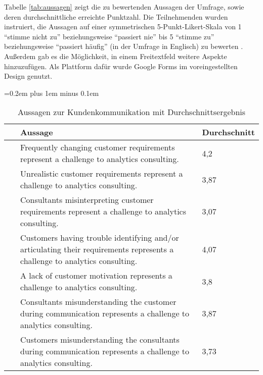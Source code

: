 \documentclass[../main.tex]{subfiles}
\begin{document}
Tabelle \ref{tab:aussagen} zeigt die zu bewertenden Aussagen der Umfrage, sowie deren durchschnittliche erreichte Punktzahl.
Die Teilnehmenden wurden instruiert, die Aussagen auf einer symmetrischen 5-Punkt-Likert-Skala von 1 “stimme nicht zu” beziehungsweise “passiert nie” bis 5 “stimme zu” beziehungsweise “passiert häufig” (in der Umfrage in Englisch) zu bewerten \autocite{joshi2015likert}. 
Außerdem gab es die Möglichkeit, in einem Freitextfeld weitere Aspekte hinzuzufügen.
Als Plattform dafür wurde Google Forms im voreingestellten Design genutzt.

\begin{dontcount}
    \small
    \spaceskip=0.2em plus 1em minus 0.1em
    \renewcommand{\arraystretch}{0.85}
    \begin{xltabular}[h]{\linewidth}{| N X | m{2.2cm}|}
        \caption{Aussagen zur Kundenkommunikation mit Durchschnittsergebnis \label{tab:aussagen}} \\
        \hline
         & Aussage & Durchschnitt \\
        \hline
        \hline
        \label{q:1} &\hspace{-0.8em}Frequently changing customer requirements represent a challenge to analytics consulting.& 4,2\\
        \hline  
        \label{q:2}&\hspace{-0.8em}Unrealistic customer requirements represent a challenge to analytics consulting. & 3,87 \\
        \hline
        \label{q:3}&\hspace{-0.8em}Consultants misinterpreting customer requirements represent a challenge to analytics consulting. & 3,07  \\
        \hline
        \label{q:4}&\hspace{-0.8em}Customers having trouble identifying and/or articulating their requirements represents a challenge to analytics consulting.  & 4,07  \\
        \hline
        \label{q:5}&\hspace{-0.8em}A lack of customer motivation represents a challenge to analytics consulting. & 3,8  \\
        \hline
        \label{q:6}&\hspace{-0.8em}Consultants misunderstanding the customer during communication represents a challenge to analytics consulting. & 3,87  \\
        \hline
        \label{q:7}&\hspace{-0.8em}Customers misunderstanding the consultants during communication represents a challenge to analytics consulting. & 3,73  \\

\end{xltabular}
\end{dontcount}
\end{document}
